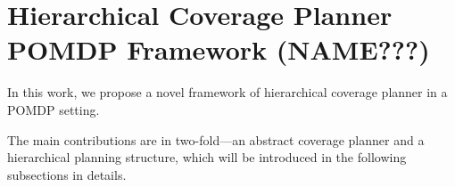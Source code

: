 \documentclass{article}
\begin{document}










\section{Hierarchical Coverage Planner POMDP Framework (NAME???)}



In this work, we propose a novel framework of hierarchical coverage planner in a POMDP setting.

The main contributions are in two-fold---an abstract coverage planner and a hierarchical planning structure, which will be introduced in the following subsections in details.
\end{document}
